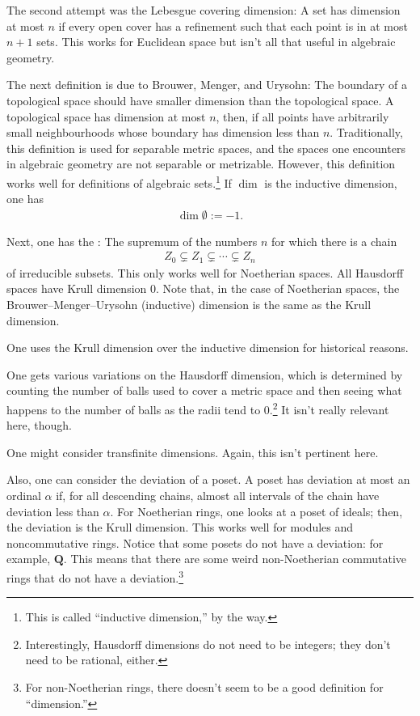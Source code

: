 \documentclass [11 pt, oneside] {article}
\begin{document}
The second attempt was the Lebesgue covering dimension: A set has dimension at most $n$ if every open cover has a refinement such that each point is in at most $n+1$ sets. This works for Euclidean space but isn't all that useful in algebraic geometry.

The next definition is due to Brouwer, Menger, and Urysohn: The boundary of a topological space should have smaller dimension than the topological space. A topological space has dimension at most $n$, then, if all points have arbitrarily small neighbourhoods whose boundary has dimension less than $n$. Traditionally, this definition is used for separable metric spaces, and the spaces one encounters in algebraic geometry are not separable or metrizable. However, this definition works well for definitions of algebraic sets.\footnote{This is called ``inductive dimension,'' by the way.} If $\dim$ is the inductive dimension, one has
\begin{align*}
	\dim \emptyset := -1.
\end{align*}

Next, one has the : The supremum of the numbers $n$ for which there is a chain
\begin{align*}
	Z_0\subsetneq Z_1\subsetneq \cdots \subsetneq Z_n
\end{align*}
of irreducible subsets. This only works well for Noetherian spaces. All Hausdorff spaces have Krull dimension $0$. Note that, in the case of Noetherian spaces, the Brouwer--Menger--Urysohn (inductive) dimension is the same as the Krull dimension.

\begin{remark}
	One uses the Krull dimension over the inductive dimension for historical reasons.
\end{remark}

One gets various variations on the Hausdorff dimension, which is determined by counting the number of balls used to cover a metric space and then seeing what happens to the number of balls as the radii tend to $0$.\footnote{Interestingly, Hausdorff dimensions do not need to be integers; they don't need to be rational, either.} It isn't really relevant here, though.

One might consider transfinite dimensions. Again, this isn't pertinent here.

Also, one can consider the deviation of a poset. A poset has deviation at most an ordinal $\alpha$ if, for all descending chains, almost all intervals of the chain have deviation less than $\alpha$. For Noetherian rings, one looks at a poset of ideals; then, the deviation is the Krull dimension. This works well for modules and noncommutative rings. Notice that some posets do not have a deviation: for example, $\mathbf{Q}$. This means that there are some weird non-Noetherian commutative rings that do not have a deviation.\footnote{For non-Noetherian rings, there doesn't seem to be a good definition for ``dimension.''}
\end{document}

